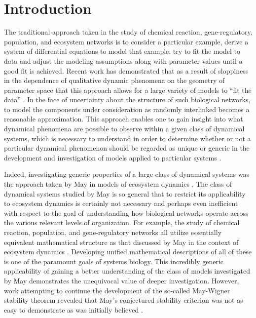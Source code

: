 \documentclass{amsart}
\theoremstyle{definition}
\theoremstyle{remark}
\numberwithin{equation}{section}
\begin{document}
\maketitle


\section{Introduction}

The traditional approach taken in the study of chemical reaction, gene-regulatory, population, and ecosystem networks is to consider a particular example, derive a system of differential equations to model that example, try to fit the model to data and adjust the modeling assumptions along with parameter values until a good fit is achieved. Recent work has demonstrated that as a result of sloppiness in the dependence of qualitative dynamic phenomena on the geometry of parameter space that this approach allows for a large variety of models to ``fit the data'' \cite{Brown2003,Gutenkunst2007,Daniels2008a,Machta2013,Hines2014,Prabakaran2014}. In the face of uncertainty about the structure of such biological networks, to model the components under consideration as randomly interlinked becomes a reasonable approximation. This approach enables one to gain insight into what dynamical phenomena are possible to observe within a given class of dynamical systems, which is necessary to understand in order to determine whether or not a particular dynamical phenomenon should be regarded as unique or generic in the development and investigation of models applied to particular systems \cite{Gunawardena2013,Gunawardena2014}.

Indeed, investigating generic properties of a large class of dynamical systems was the approach taken by May in models of ecosystem dynamics \cite{Gardner1970,May1972}. The class of dynamical systems studied by May is so general that to restrict its applicability to ecosystem dynamics is certainly not necessary and perhaps even inefficient with respect to the goal of understanding how biological networks operate across the various relevant levels of organization. For example, the study of chemical reaction, population, and gene-regulatory networks all utilize essentially equivalent mathematical structure as that discussed by May in the context of ecosystem dynamics \cite{RossCr2003,Alon2006,Palsson2006,HamidBolouri2008,Palsson2011a,Voit2012,Sauro2012}. Developing unified mathematical descriptions of all of these is one of the paramount goals of systems biology. This incredibly generic applicability of gaining a better understanding of the class of models investigated by May demonstrates the unequivocal value of deeper investigation.  However, work attempting to continue the development of the so-called May-Wigner stability theorem revealed that May's conjectured stability criterion was not as easy to demonstrate as was initially believed \cite{Cohen1984,May1972a,Radius2014}.
\end{document}
